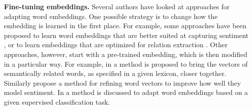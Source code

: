 
\smallskip
\noindent \textbf{Fine-tuning embeddings.} Several authors have looked at approaches for adapting word embeddings. One possible strategy is to change how the embedding is learned in the first place. For example, some approaches have been proposed to learn word embeddings that are better suited at capturing sentiment \cite{tang2016sentiment}, or to learn embeddings that are optimized for relation extraction \cite{DBLP:conf/conll/HashimotoSMT15}.
Other approaches, however, start with a pre-trained embedding, which is then modified in a particular way. For example, in \cite{faruqui2015retrofitting} a method is proposed to bring the vectors of semantically related words, as specified in a given lexicon, closer together. Similarly \cite{yu2017refining} propose a method for refining word vectors to improve how well they model sentiment. In \cite{labutov2013re} a method is discussed to adapt word embeddings based on a given supervised classification task.

